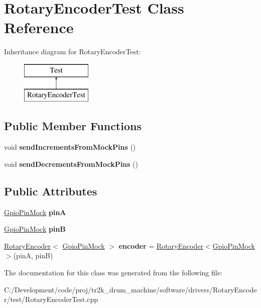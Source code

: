 \hypertarget{class_rotary_encoder_test}{}\section{Rotary\+Encoder\+Test Class Reference}
\label{class_rotary_encoder_test}
Inheritance diagram for Rotary\+Encoder\+Test\+:\begin{figure}[H]
\begin{center}
\leavevmode
\includegraphics[height=2.000000cm]{class_rotary_encoder_test}
\end{center}
\end{figure}
\subsection*{Public Member Functions}
\begin{DoxyCompactItemize}
\item 
\mbox{\label{class_rotary_encoder_test_ae0061291e914d8a34ea2b59e17c57bd6}} 
void {\bfseries send\+Increments\+From\+Mock\+Pins} ()
\item 
\mbox{\label{class_rotary_encoder_test_ad6d7c12418ed16e8a54e866515294e44}} 
void {\bfseries send\+Decrements\+From\+Mock\+Pins} ()
\end{DoxyCompactItemize}
\subsection*{Public Attributes}
\begin{DoxyCompactItemize}
\item 
\mbox{\label{class_rotary_encoder_test_a8079cd19d6660966a63c83257a9bab2f}} 
\mbox{\hyperlink{class_gpio_pin_mock}{Gpio\+Pin\+Mock}} {\bfseries pinA}
\item 
\mbox{\label{class_rotary_encoder_test_af7150e74ea15ac798ff338d228e36995}} 
\mbox{\hyperlink{class_gpio_pin_mock}{Gpio\+Pin\+Mock}} {\bfseries pinB}
\item 
\mbox{\label{class_rotary_encoder_test_a88efb9449b23f19dba25f6e7e960b900}} 
\mbox{\hyperlink{class_rotary_encoder}{Rotary\+Encoder}}$<$ \mbox{\hyperlink{class_gpio_pin_mock}{Gpio\+Pin\+Mock}} $>$ {\bfseries encoder} = \mbox{\hyperlink{class_rotary_encoder}{Rotary\+Encoder}}$<$\mbox{\hyperlink{class_gpio_pin_mock}{Gpio\+Pin\+Mock}}$>$(pinA, pinB)
\end{DoxyCompactItemize}


The documentation for this class was generated from the following file\+:\begin{DoxyCompactItemize}
\item 
C\+:/\+Development/code/proj/tr2k\+\_\+drum\+\_\+machine/software/drivers/\+Rotary\+Encoder/test/Rotary\+Encoder\+Test.\+cpp\end{DoxyCompactItemize}
